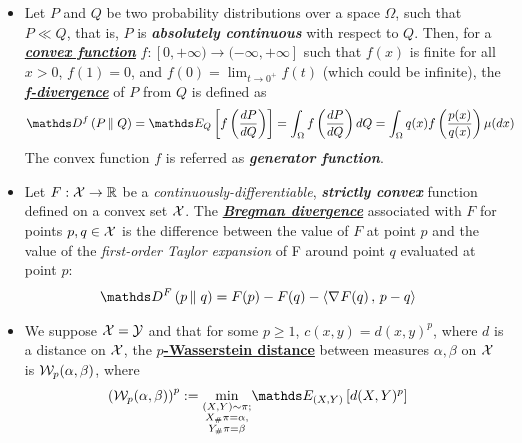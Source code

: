\documentclass[11pt]{article}
\begin{document}
\begin{itemize}
\item   \begin{definition}
Let $P$ and $Q$ be two probability distributions over a space $\Omega$, such that  $P\ll Q$, that is, $P$ is \emph{\textbf{absolutely continuous}} with respect to $Q$. Then, for a \underline{\emph{\textbf{convex function}}}  $f: [0, +\infty)\to (-\infty ,+\infty]$ such that $f(x)$ is finite for all $x>0$, \underline{$f(1)=0$}, and  \underline{$f(0)=\lim _{t\to 0^{+}}f(t)$} (which could be infinite), the \underline{\emph{\textbf{f-divergence}}} of $P$ from $Q$ is defined as
\begin{align}
\divg{f}{P}{Q} &= \E{Q}{f\paren{\frac{dP}{dQ}}} =  \int_{\Omega} f\paren{\frac{dP}{dQ}} dQ  =  \int_{\Omega} q(x) f\paren{\frac{p(x)}{q(x)}} \mu(dx)  \label{eqn: f_divg}
\end{align} The convex function $f$ is referred as \emph{\textbf{generator function}}.
\end{definition}

\item \begin{definition}
Let $F: {\mathcal X} \rightarrow {\mathbb R}$ be a \emph{continuously-differentiable}, \emph{\textbf{strictly convex}} function defined on a convex set ${\mathcal X}$. The \underline{\textbf{\emph{Bregman divergence}}} associated with $F$ for points $p,q \in {\mathcal X}$ is the difference between the value of $F$ at point $p$ and the value of the \emph{first-order Taylor expansion} of F around point $q$ evaluated at point $p$:
\begin{align}
\divg{F}{p}{q} &= F(p) - F(q) - \inn{\grad{}{F}(q)}{p - q} \label{eqn: bregman_divg}
\end{align}
\end{definition}

\item \begin{definition}
We suppose ${\mathcal X} = {\mathcal Y}$ and that for some $p \ge 1$, $c(x,y)= d(x,y)^p$, where $d$ is a distance on ${\mathcal X}$,  the \underline{\textbf{$p$-Wasserstein distance}} between measures $\alpha, \beta$ on ${\mathcal X}$ is ${\mathcal W}_{p}(\alpha, \beta)$, where
\begin{align}
\paren{\cW_{p}(\alpha, \beta)}^{p}:= \min_{\substack{(X, Y) \sim \pi; \\ X_{\#}\pi = \alpha,\\ Y_{\#}\pi = \beta}}& \E{(X,Y)}{d(X, Y)^{p}}\label{eqn: wasserstein_dist}
\end{align}
\end{definition}
\end{itemize}
\end{document}
